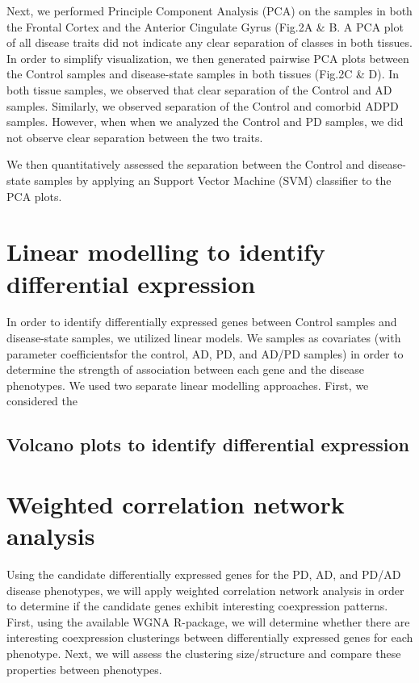 Next, we performed Principle Component Analysis (PCA) on the samples in both the Frontal Cortex and the Anterior Cingulate Gyrus (Fig.2A & B. A PCA plot of all disease traits did not indicate any clear separation of classes in both tissues. In order to simplify visualization, we then generated pairwise PCA plots between the Control samples and disease-state samples in both tissues (Fig.2C & D). In both tissue samples, we observed that clear separation of the Control and AD samples. Similarly, we observed separation of the Control and comorbid ADPD samples. However, when when we analyzed the Control and PD samples, we did not observe clear separation between the two traits.

We then quantitatively assessed the separation between the Control and disease-state samples by applying an Support Vector Machine (SVM) classifier to the PCA plots. 

\section{Linear modelling to identify differential expression}
\label{sec:line-modell-ident}

In order to identify differentially expressed genes between Control samples and disease-state samples, we utilized linear models. We  samples as covariates (with parameter coefficientsfor the control, AD, PD, and AD/PD samples) in order to determine the strength of association between each gene and the disease phenotypes. We used two separate linear modelling approaches. First, we considered the



\subsection{Volcano plots to identify differential expression}
\label{subsec:volc-plots-ident}


\section{Weighted correlation network analysis}
\label{sec:weight-corr-netw}

 Using the candidate differentially expressed genes for the PD, AD, and PD/AD disease phenotypes, we will apply weighted correlation network analysis in order to determine if the candidate genes exhibit interesting coexpression patterns. First, using the available WGNA R-package\cite{Langfelder2008}, we will determine whether there are interesting coexpression clusterings between differentially expressed genes for each phenotype. Next, we will assess the clustering size/structure and compare these properties between phenotypes.

